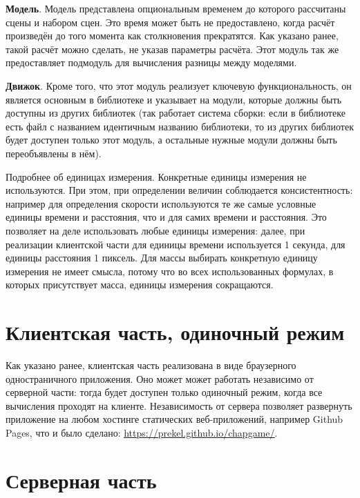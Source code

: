 \textbf{Модель}.\label{modeldescr}
Модель представлена опциональным временем до которого рассчитаны сцены и набором сцен.
Это время может быть не предоставлено, когда расчёт произведён до того момента как столкновения прекратятся.
Как указано ранее, такой расчёт можно сделать, не указав параметры расчёта.
Этот модуль так же предоставляет подмодуль для вычисления разницы между моделями.

\textbf{Движок}.\label{enginedescr}
Кроме того, что этот модуль реализует ключевую функциональность, он является основным в библиотеке и указывает на модули, которые
должны быть доступны из других библиотек (так работает система сборки:
если в библиотеке есть файл с названием идентичным названию библиотеки, то из других библиотек будет доступен только этот модуль,
а остальные нужные модули должны быть переобъявлены в нём).

\TODO

\TODO Подробнее об единицах измерения. Конкретные единицы измерения не используются.
При этом, при определении величин соблюдается консистентность: например для определения скорости используются
те же самые условные единицы времени и расстояния, что и для самих времени и расстояния. Это позволяет на деле использовать
любые единицы измерения: далее, при реализации клиентской части для единицы времени используется 1 секунда,
для единицы расстояния 1 пиксель. Для массы выбирать конкретную единицу измерения не имеет смысла, потому что во всех
использованных формулах, в которых присутствует масса, единицы измерения сокращаются.

\TODO

\section{Клиентская часть, одиночный режим}\label{clientimpl}

\TODO

\TODO Как указано ранее, клиентская часть реализована в виде браузерного одностраничного приложения.
Оно может может работать независимо от серверной части: тогда будет доступен только одиночный режим,
когда все вычисления проходят на клиенте. Независимость от сервера позволяет развернуть приложение на
любом хостинге статических веб-приложений, например Github Pages, что и было сделано:
\uline{\href{https://prekel.github.io/chapgame/}{https://prekel.github.io/chapgame/}}.

\TODO

\section{Серверная часть}\label{serverimpl}

